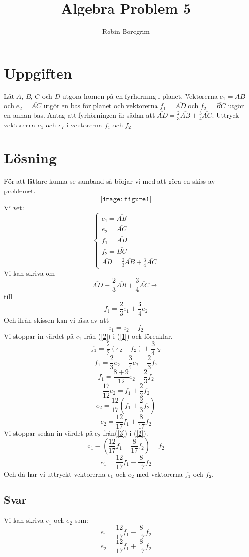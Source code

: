 \documentclass[11pt]{article}
\begin{document}
\title{Algebra Problem 5}
\author{Robin Boregrim}
\maketitle
\renewcommand{\contentsname}{Innehållsförteckning}
\tableofcontents
\newpage
\section{Uppgiften}
Låt $A$, $B$, $C$ och $D$ utgöra hörnen på en fyrhörning i planet. Vektorerna $e_1 = \overline{AB}$ och $e_2 = \overline{AC}$ utgör en bas för planet och vektorerna $f_1 = \overline{AD}$ och $f_2 = \overline{BC}$ utgör en annan bas. Antag att fyrhörningen är sådan att $\overline{AD} = \frac{2}{3}\overline{AB} + \frac{3}{4}\overline{AC}$. Uttryck vektorerna $e_1$ och $e_2$ i vektorerna $f_1$ och $f_2$.
\section{Lösning}
För att lättare kunna se samband så börjar vi med att göra en skiss av problemet.
$$
\texttt{[image: figure1]}
$$
Vi vet:
$$
\left\{\begin{array}{c}
e_1 = \overline{AB}\\
e_2 = \overline{AC}\\
f_1 = \overline{AD} \\
f_2 = \overline{BC}\\
\overline{AD} = \frac{2}{3}\overline{AB} + \frac{3}{4}\overline{AC}
\end{array}\right.
$$
Vi kan skriva om
$$\overline{AD} = \frac{2}{3}\overline{AB} + \frac{3}{4}\overline{AC}  \Rightarrow$$ till
\begin{equation}\label{1}
	f_1 = \frac{2}{3}e_1 + \frac{3}{4}e_2
\end{equation}
Och ifrån skissen kan vi läsa av att 
\begin{equation}\label{2}
	e_1 = e_2 - f_2
\end{equation}
Vi stoppar in värdet på $e_1$ från (\ref{2}) i (\ref{1}) och förenklar.
$$f_1 = \frac{2}{3}(e_2 - f_2) + \frac{3}{4}e_2$$
$$f_1 = \frac{2}{3}e_2 + \frac{3}{4}e_2 - \frac{2}{3}f_2 $$
$$f_1  = \frac{8+9}{12}e_2 -\frac{2}{3}f_2$$
$$\frac{17}{12}e_2= f_1 + \frac{2}{3}f_2$$
$$e_2=\frac{12}{17} (f_1 + \frac{2}{3}f_2)$$
\begin{equation}\label{3}
e_2=\frac{12}{17}f_1 + \frac{8}{17}f_2
\end{equation}
Vi stoppar sedan in värdet på $e_2$ från(\ref{3}) i (\ref{2}).
$$e_1 = (\frac{12}{17}f_1 + \frac{8}{17}f_2) - f_2 $$
$$e_1 = \frac{12}{17}f_1 - \frac{8}{17}f_2$$
Och då har vi uttryckt vektorerna $e_1$ och $e_2$ med vektorerna $f_1$ och $f_2$.
\subsection{Svar}
Vi kan skriva $e_1$ och $e_2$ som:
$$e_1 = \frac{12}{17}f_1 - \frac{8}{17}f_2$$
$$e_2=\frac{12}{17}f_1 + \frac{8}{17}f_2$$
\end{document}
